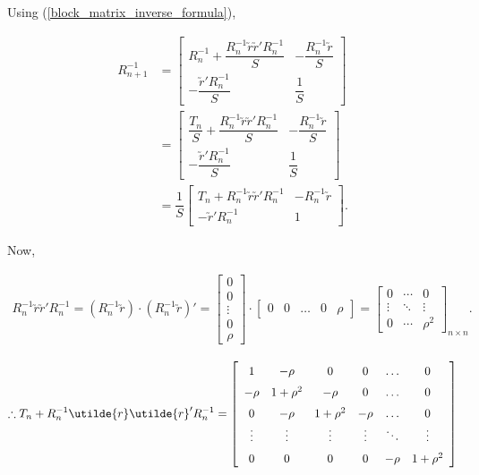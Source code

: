 \documentclass[11pt, a4paper]{article}
\begin{document}
\begin{itemize}
Using (\ref{block_matrix_inverse_formula}), 

\begin{align*}
R_{n+1}^{-1} &=
\begin{bmatrix}
R_n^{-1} + \dfrac{R_n^{-1} \utilde{r} \utilde{r}' R_n^{-1}}{S} & -\dfrac{R_n^{-1} \utilde{r}}{S} \\[1.5em]
-\dfrac{\utilde{r}' R_n^{-1}}{S} & \dfrac{1}{S}
\end{bmatrix} \\[1em]
&=
\begin{bmatrix}
\dfrac{T_n}{S} + \dfrac{R_n^{-1} \utilde{r} \utilde{r}' R_n^{-1}}{S} & -\dfrac{R_n^{-1} \utilde{r}}{S} \\[1.5em]
-\dfrac{\utilde{r}' R_n^{-1}}{S} & \dfrac{1}{S}
\end{bmatrix} \\[1em]
&=
\dfrac{1}{S}
\begin{bmatrix}
T_n + R_n^{-1} \utilde{r} \utilde{r}' R_n^{-1} & -R_n^{-1} \utilde{r} \\[1.5em]
-\utilde{r}' R_n^{-1} & 1
\end{bmatrix}.
\end{align*}


Now,

\begin{align*}
R_n^{-1} \utilde{r} \utilde{r}' R_n^{-1} = \left(R_n^{-1} \utilde{r}\right) \cdot \left(R_n^{-1} \utilde{r}\right)' = \begin{bmatrix}
0 \\
0 \\
\vdots \\
0 \\
\rho
\end{bmatrix} \cdot \begin{bmatrix} 0 &
0 & \ldots & 0 & \rho \end{bmatrix} 
=
\begin{bmatrix}
0 & \cdots & 0 \\
\vdots & \ddots & \vdots \\
0 & \cdots & \rho^2
\end{bmatrix}_{n \times n}.
\end{align*}

\begin{align*}
\therefore T_n + R_n^{-1} \utilde{r} \utilde{r}' R_n^{-1} = 
{
\renewcommand{\arraystretch}{1.5}
\left[
\begin{array}{cccccc}
1 & -\rho & 0 & 0 & \ldots & 0 \\
-\rho & 1+\rho^2 & -\rho & 0 & \ldots & 0 \\
0 & -\rho & 1+\rho^2 & -\rho & \ldots & 0 \\
\vdots & \vdots & \vdots & \vdots & \ddots & \vdots \\
0 & 0 & 0 & 0 & -\rho & 1 + \rho^2
\end{array}
\right]
}
\end{align*}


\end{itemize}
\end{document}
